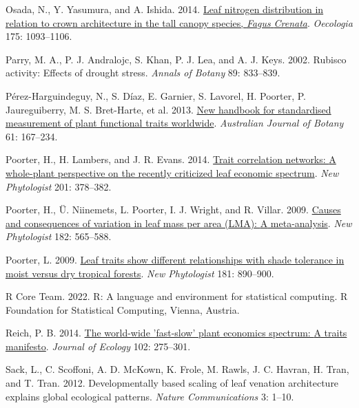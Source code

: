 \documentclass[
  12pt,
  a4paper,
,tablecaptionabove
]{scrartcl}
\newlength{\cslhangindent}
\newenvironment{CSLReferences}[2] %
 {%
  \setlength{\parindent}{0pt}
  \ifodd #1 \everypar{\setlength{\hangindent}{\cslhangindent}}\ignorespaces\fi
  \ifnum #2 > 0
  \setlength{\parskip}{#2\baselineskip}
  \fi
 }%
 {}
\begin{document}
\begin{CSLReferences}{1}{0}
\leavevmode{}%
Osada, N., Y. Yasumura, and A. Ishida. 2014. \href{https://doi.org/10.1007/s00442-014-2966-y}{Leaf nitrogen distribution in relation to crown architecture in the tall canopy species, {\emph{Fagus}}{ \emph{Crenata}}}. \emph{Oecologia} 175: 1093--1106.

\leavevmode{}%
Parry, M. A., P. J. Andralojc, S. Khan, P. J. Lea, and A. J. Keys. 2002. Rubisco activity: Effects of drought stress. \emph{Annals of Botany} 89: 833--839.

\leavevmode{}%
Pérez-Harguindeguy, N., S. Díaz, E. Garnier, S. Lavorel, H. Poorter, P. Jaureguiberry, M. S. Bret-Harte, et al. 2013. \href{https://doi.org/10.1071/BT12225}{New handbook for standardised measurement of plant functional traits worldwide}. \emph{Australian Journal of Botany} 61: 167--234.

\leavevmode{}%
Poorter, H., H. Lambers, and J. R. Evans. 2014. \href{https://doi.org/10.1111/nph.12547}{Trait correlation networks: {A} whole-plant perspective on the recently criticized leaf economic spectrum}. \emph{New Phytologist} 201: 378--382.

\leavevmode{}%
Poorter, H., Ü. Niinemets, L. Poorter, I. J. Wright, and R. Villar. 2009. \href{https://doi.org/10.1111/j.1469-8137.2009.02830.x}{Causes and consequences of variation in leaf mass per area ({LMA}): {A} meta-analysis}. \emph{New Phytologist} 182: 565--588.

\leavevmode{}%
Poorter, L. 2009. \href{https://doi.org/10.1111/j.1469-8137.2008.02715.x}{Leaf traits show different relationships with shade tolerance in moist versus dry tropical forests}. \emph{New Phytologist} 181: 890--900.

\leavevmode{}%
R Core Team. 2022. R: {A} language and environment for statistical computing. {R Foundation for Statistical Computing}, {Vienna, Austria}.

\leavevmode{}%
Reich, P. B. 2014. \href{https://doi.org/10.1111/1365-2745.12211}{The world-wide 'fast-slow' plant economics spectrum: {A} traits manifesto}. \emph{Journal of Ecology} 102: 275--301.

\leavevmode{}%
Sack, L., C. Scoffoni, A. D. McKown, K. Frole, M. Rawls, J. C. Havran, H. Tran, and T. Tran. 2012. Developmentally based scaling of leaf venation architecture explains global ecological patterns. \emph{Nature Communications} 3: 1--10.


\end{CSLReferences}
\end{document}
